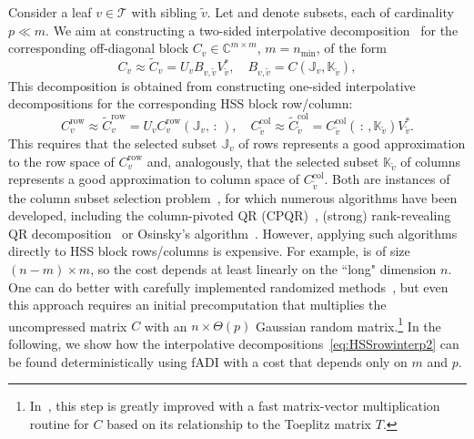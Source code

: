 \documentclass[final,reqno,onefignum,onetabnum]{siamart190516}
\newcommand{\C}{\mathbb{C}}
\newcommand{\nmin}{n_{\min}}
\begin{document}
Consider a leaf $v \in \mathcal T$ with sibling $\tilde v$. Let  and  denote subsets, each of cardinality $p \ll m$. We aim at constructing 
a two-sided interpolative decomposition~\cite{cheng2005compression} for the corresponding off-diagonal block $C_v \in \C^{m \times m}$, $m = \nmin$, of the form
\begin{equation}
\label{eq:block_factors}
 C_v \approx \widetilde{C}_v = U_v B_{v, \tilde{v}} V_{\tilde{v}}^*, \quad B_{v, \tilde{v}} = C(\mathbb{J}_v, \mathbb{K}_{\tilde{v}}),
 \end{equation} 
 This decomposition is obtained from constructing one-sided 
interpolative decompositions for the corresponding HSS block row/column:
\begin{equation} 
\label{eq:HSSrowinterp2} 
C_v^{\mathrm{row}} \approx \widetilde{C}_v^{\mathrm{row}}  = U_v  C_v^{\mathrm{row}}(\mathbb{J}_v, \, :\,), \quad 
C_{\tilde v}^{\mathrm{col}} \approx \widetilde{C}_{\tilde v}^{\mathrm{col}}  = C_{\tilde v}^{\mathrm{col}}(\, :\,, \mathbb K_{\tilde v}) V_{\tilde v}^*.
\end{equation}
This requires that the selected subset $\mathbb{J}_v$ of rows represents a good approximation 
to the row space of $C_v^{\mathrm{row}}$
and, analogously, that the 
selected subset $\mathbb{K}_{\tilde v}$ of columns represents a good approximation 
to column space of $C_{\tilde v}^{\mathrm{col}}$. Both are instances of the column subset selection problem~\cite{broadbent2010subset}, for which numerous algorithms have been developed, including 
the column-pivoted QR (CPQR)~\cite{GolubVanLoan2013}, (strong) rank-revealing QR decomposition~\cite{gu1996efficient} or Osinsky's algorithm~\cite{Osinsky2023}.
However, applying such algorithms directly to HSS block rows/columns is expensive. For example,  is of size \hbox{$(n\!-\!m) \times m$}, so the cost depends at least linearly on the ``long" dimension $n$.  One can do better with carefully implemented randomized methods~\cite{martinsson2011fast,xia2012superfast}, but even this approach requires an initial precomputation that multiplies the uncompressed matrix $C$ with an $n \times \Theta(p)$ Gaussian random matrix.\footnote{In~\cite{xia2012superfast}, this step is greatly improved with a fast matrix-vector multiplication routine for $C$ based on its relationship to the Toeplitz matrix $T$.} 
In the following, we show how the interpolative decompositions~\eqref{eq:HSSrowinterp2} 
can be found deterministically using fADI with a cost that depends only on $m$ and $p$.
\end{document}
